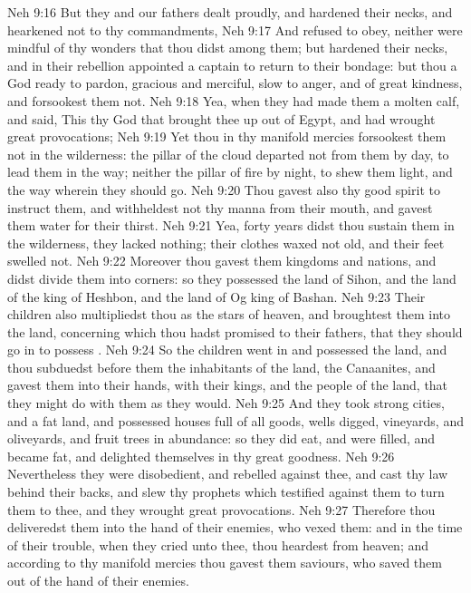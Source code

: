 \vs Neh 9:16 But they and our fathers dealt proudly, and hardened their necks, and hearkened not to thy commandments,
\vs Neh 9:17 And refused to obey, neither were mindful of thy wonders that thou didst among them; but hardened their necks, and in their rebellion appointed a captain to return to their bondage: but thou  a God ready to pardon, gracious and merciful, slow to anger, and of great kindness, and forsookest them not.
\vs Neh 9:18 Yea, when they had made them a molten calf, and said, This  thy God that brought thee up out of Egypt, and had wrought great provocations;
\vs Neh 9:19 Yet thou in thy manifold mercies forsookest them not in the wilderness: the pillar of the cloud departed not from them by day, to lead them in the way; neither the pillar of fire by night, to shew them light, and the way wherein they should go.
\vs Neh 9:20 Thou gavest also thy good spirit to instruct them, and withheldest not thy manna from their mouth, and gavest them water for their thirst.
\vs Neh 9:21 Yea, forty years didst thou sustain them in the wilderness,  they lacked nothing; their clothes waxed not old, and their feet swelled not.
\vs Neh 9:22 Moreover thou gavest them kingdoms and nations, and didst divide them into corners: so they possessed the land of Sihon, and the land of the king of Heshbon, and the land of Og king of Bashan.
\vs Neh 9:23 Their children also multipliedst thou as the stars of heaven, and broughtest them into the land, concerning which thou hadst promised to their fathers, that they should go in to possess .
\vs Neh 9:24 So the children went in and possessed the land, and thou subduedst before them the inhabitants of the land, the Canaanites, and gavest them into their hands, with their kings, and the people of the land, that they might do with them as they would.
\vs Neh 9:25 And they took strong cities, and a fat land, and possessed houses full of all goods, wells digged, vineyards, and oliveyards, and fruit trees in abundance: so they did eat, and were filled, and became fat, and delighted themselves in thy great goodness.
\vs Neh 9:26 Nevertheless they were disobedient, and rebelled against thee, and cast thy law behind their backs, and slew thy prophets which testified against them to turn them to thee, and they wrought great provocations.
\vs Neh 9:27 Therefore thou deliveredst them into the hand of their enemies, who vexed them: and in the time of their trouble, when they cried unto thee, thou heardest  from heaven; and according to thy manifold mercies thou gavest them saviours, who saved them out of the hand of their enemies.
